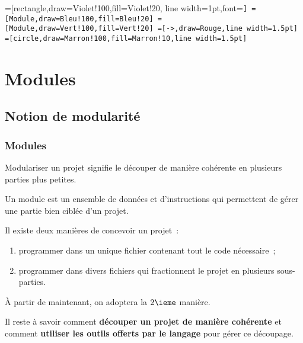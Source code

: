 
=[rectangle,draw=Violet!100,fill=Violet!20,
    line width=1pt,font=\scriptsize\tt]
=[Module,draw=Bleu!100,fill=Bleu!20]
=[Module,draw=Vert!100,fill=Vert!20]
=[->,draw=Rouge,line width=1.5pt]
=[circle,draw=Marron!100,fill=Marron!10,line width=1.5pt]

\section{Modules}

\subsection{Notion de modularité}

\begin{frame}[fragile]
\frametitle{Modules}
\alert{Modulariser} un projet signifie le découper de manière cohérente
en plusieurs parties plus petites.
\medskip

Un \alert{module} est un ensemble de données et d'instructions qui
permettent de gérer une partie bien ciblée d'un projet.
\bigskip

Il existe deux manières de concevoir un projet~:
\smallskip

\begin{enumerate}
    \item programmer dans un unique fichier contenant tout
    le code nécessaire~;
    \smallskip

    \item programmer dans divers fichiers qui fractionnent le projet
    en plusieurs sous-parties.
\end{enumerate}
\medskip

À partir de maintenant, on adoptera la $2\ieme$ manière.
\bigskip

Il reste à savoir comment {\bf découper un projet de manière cohérente}
et comment {\bf utiliser les outils offerts par le langage} pour gérer ce
découpage.
\end{frame}

